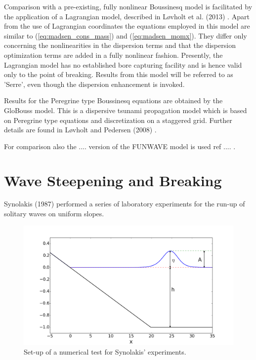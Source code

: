 \documentclass[review]{elsarticle}
\begin{document}
Comparison with a pre-existing, fully nonlinear Boussinesq model is
facilitated by the application of a Lagrangian model, described
in L\o vholt et al. (2013) \cite{Lovholt:2013a}. Apart from the use of
Lagrangian coordinates the equations employed in this model are
 similar to (\ref{eq:madsen_cons_mass}) and (\ref{eq:madsen_momx}).
They differ only concerning the nonlinearities in the
dispersion terms and that  the dispersion optimization terms are added in a fully nonlinear fashion.
Presently, the Lagrangian model has no established bore capturing 
facility and is hence valid only to the point of breaking.
Results from this model will be referred to as 'Serre', even though
the dispersion enhancement is invoked. 
 
Results for the Peregrine type Boussinesq equations are obtained by the
GloBouss model. This is a dispersive tsunami propagation model which
is based on Peregrine type equations and discretization on a staggered grid. Further details are found in L\o vholt and Pedersen (2008)
\cite{Lovholt:2008b}.

For comparison also the .... version of the FUNWAVE model is used
ref .... . 

\section{Wave Steepening and Breaking}



Synolakis (1987) \cite{synolakis1987runup} performed 
a series of laboratory experiments for the run-up of solitary waves
on uniform slopes.

\begin{figure}[!htb]
\centering
\includegraphics[width=.7\textwidth]{_fig/initial_setup.png}
\caption{Set-up of a numerical test for Synolakis' experiments.}
\label{fig:init_setup}
\end{figure}
\end{document}
